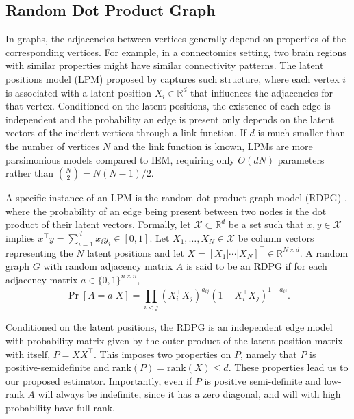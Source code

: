 \documentclass[journal,twoside,web]{ieeecolor}
\renewcommand{\Re}{\mathbb{R}}
\begin{document}
\subsection{Random Dot Product Graph}
In graphs, the adjacencies between vertices generally depend on properties of the corresponding vertices.
For example, in a connectomics setting,  two brain regions with similar properties might have similar connectivity patterns. %
The latent positions model (LPM) proposed by \cite{hoff2002latent} captures such structure, where each vertex $i$ is associated with a latent position $X_i\in \Re^d$ that influences the adjacencies for that vertex.
Conditioned on the latent positions, the existence of each edge is independent and the probability an edge is present only depends on the latent vectors of the incident vertices through a link function.
If $d$ is much smaller than the number of vertices $N$ and the link function is known, LPMs are more parsimonious models compared to IEM, requiring only $O(dN)$ parameters rather than $\binom{N}{2}=N(N-1)/2$.

A specific instance of an LPM is the random dot product graph model (RDPG) \cite{young2007random, nickel2007random}, where the probability of an edge being present between two nodes is the dot product of their latent vectors.
% 
Formally, let $\mathcal{X} \subset \Re^d$ be a set such that $x, y \in \mathcal{X}$ implies $x^{\top} y =\sum_{i = 1}^d x_i y_i \in [0, 1]$.
Let $X_1,\dotsc,X_N\in \mathcal{X}$ be column vectors representing the $N$ latent positions and let $X = [X_1|\cdots|X_N]^{\top} \in \Re^{N \times d}$.
A random graph $G$ with random adjacency matrix $A$ is said to be an RDPG if for each adjacency matrix $a\in\{0,1\}^{n\times n}$,
\[
    \Pr[A = a|X] = \prod_{i<j} (X_i^{\top} X_j)^{a_{ij}} ( 1 - X_i^{\top} X_j)^{1 - a_{ij}}.
\]

Conditioned on the latent positions, the RDPG is an independent edge model with probability matrix given by the outer product of the latent position matrix with itself, $P = X X^{\top}$.
This imposes two properties on $P$, namely that $P$ is positive-semidefinite and $\mathrm{rank}(P)=\mathrm{rank}(X)\leq d$.
These properties lead us to our proposed estimator.
Importantly, even if $P$ is positive semi-definite and low-rank $A$ will always be indefinite, since it has a zero diagonal, and will with high probability have full rank.
\end{document}
